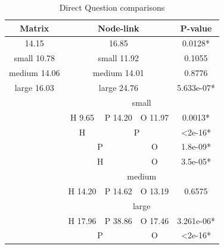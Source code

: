 \documentclass{l4proj}
\begin{document}
\begin{table}[H]
\centering
\caption{Direct Question comparisons}
\label{directResults}
\begin{tabular}{|c|c|c|c|c|c|c|}
\hline
\multicolumn{3}{|c|}{\textbf{Matrix}}     & \multicolumn{3}{c|}{\textbf{Node-link}} & \textbf{P-value}              \\ \hline
\multicolumn{3}{|c|}{14.15}               & \multicolumn{3}{c|}{16.85}              & 0.0128*                       \\ \hline
\multicolumn{3}{|c|}{small 10.78}         & \multicolumn{3}{c|}{small 11.92}        & 0.1055                        \\ \hline
\multicolumn{3}{|c|}{medium 14.06}        & \multicolumn{3}{c|}{medium 14.01}       & 0.8776                        \\ \hline
\multicolumn{3}{|c|}{large 16.03}         & \multicolumn{3}{c|}{large 24.76}        & 5.633e-07*                    \\ \hline
\multicolumn{3}{|c|}{\multirow{12}{*}{}}  & \multicolumn{4}{c|}{small}                                              \\ \cline{4-7} 
\multicolumn{3}{|c|}{}                    & H 9.65      & P 14.20     & O 11.97     & 0.0013*                       \\ \cline{4-7} 
\multicolumn{3}{|c|}{}                    & H           & \multicolumn{2}{c|}{P}    & \textless2e-16*               \\ \cline{4-7} 
\multicolumn{3}{|c|}{}                    & \multicolumn{2}{c|}{P}    & O           & 1.8e-09*                      \\ \cline{4-7} 
\multicolumn{3}{|c|}{}                    & \multicolumn{2}{c|}{H}    & O           & 3.5e-05*                      \\ \cline{4-7} 
\multicolumn{3}{|c|}{}                    & \multicolumn{4}{c|}{medium}                                             \\ \cline{4-7} 
\multicolumn{3}{|c|}{}                    & H 14.20     & P 14.62     & O 13.19     & 0.6575                        \\ \cline{4-7} 
\multicolumn{3}{|c|}{}                    & \multicolumn{4}{c|}{large}                                              \\ \cline{4-7} 
\multicolumn{3}{|c|}{}                    & H 17.96     & P 38.86     & O 17.46     & 3.261e-06*                    \\ \cline{4-7} 
\multicolumn{3}{|c|}{}                    & \multicolumn{2}{c|}{P}    & O           & \textless2e-16*               \\ \cline{4-7} 

\end{tabular}
\end{table}
\end{document}
